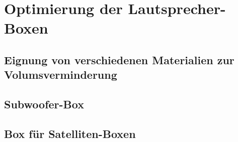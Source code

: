 \section{Optimierung der Lautsprecher-Boxen}


\subsection{Eignung von verschiedenen Materialien zur Volumsverminderung}


\subsection{Subwoofer-Box}


\subsection{Box für Satelliten-Boxen}
